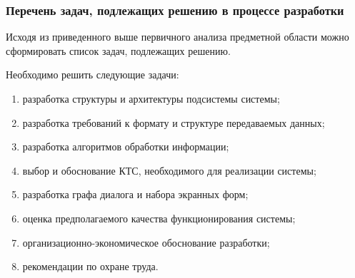 \subsubsection{Перечень задач, подлежащих решению в процессе разработки}

Исходя из приведенного выше первичного анализа предметной области можно сформировать список задач, подлежащих решению.

Необходимо решить следующие задачи:

\begin{enumerate}
\item разработка структуры и архитектуры подсистемы системы; 
\item разработка требований к формату и структуре передаваемых данных;
\item разработка алгоритмов обработки информации;
\item выбор и обоснование КТС, необходимого для реализации системы;
\item разработка графа диалога и набора экранных форм;
\item оценка предполагаемого качества функционирования системы;
\item организационно-экономическое обоснование разработки;
\item рекомендации по охране труда.
\end{enumerate}



